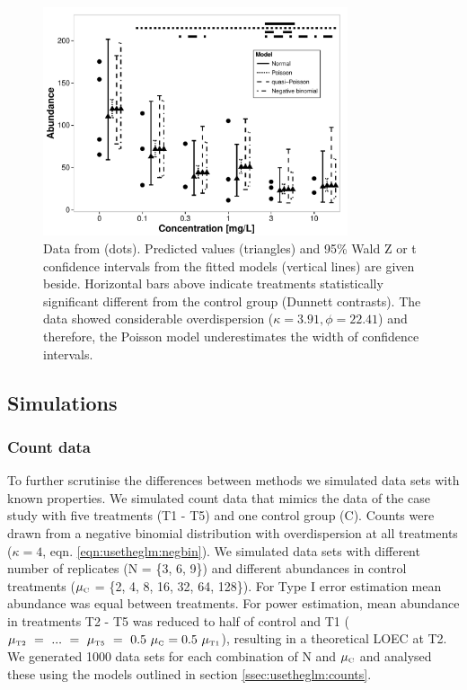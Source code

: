 \begin{figure}
  \centering
  \includegraphics[width = 0.8\textwidth]{chapters/usetheglm/example.pdf}
  \caption[Example data from Brock et al. (2015).]{Data from \citet{brock_minimum_2015} (dots). 
  Predicted values (triangles) and 95\% Wald Z or t confidence intervals from the fitted models (vertical lines) are given beside.
  Horizontal bars above indicate treatments statistically significant different from the control group (Dunnett contrasts).
  The data showed considerable overdispersion ($\kappa = 3.91, \phi = 22.41$) and therefore, the Poisson model underestimates the width of confidence intervals.
  }
  \label{fig:usetheglm:example}
\end{figure}


\subsection{Simulations}
\label{ssec:usetheglm:simulations}
\subsubsection{Count data}
To further scrutinise the differences between methods we simulated data sets with known properties.
We simulated count data that mimics the data of the case study with five treatments (T1 - T5) and one control group (C).
Counts were drawn from a negative binomial distribution with overdispersion at all treatments ($\kappa = 4$, eqn. \ref{eqn:usetheglm:negbin}).
We simulated data sets with different number of replicates (N = \{3, 6, 9\}) and different abundances in control treatments ($\mu_\text{\tiny C}$ = \{2, 4, 8, 16, 32, 64, 128\}). 
For Type I error estimation mean abundance was equal between treatments.
For power estimation, mean abundance in treatments T2 - T5 was reduced to half of control and T1 ($\mu_\text{\tiny T2}~=~...~=~\mu_\text{\tiny T5}~=~0.5~\mu_\text{\tiny C} = 0.5~\mu_\text{\tiny T1}$), resulting in a theoretical LOEC at T2.
We generated 1000 data sets for each combination of N and $\mu_\text{\tiny C}$ and analysed these using the models outlined in section \ref{ssec:usetheglm:counts}.


